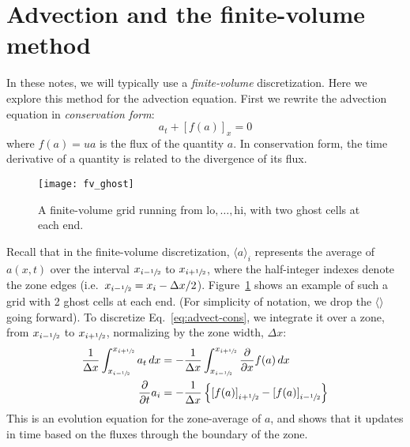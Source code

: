 
\section{Advection and the finite-volume method}

\label{ch:adv:sndorder}

In these notes, we will typically use a {\em finite-volume} discretization.  Here we
explore this method for the
advection equation.  First we rewrite the advection equation in {\em
  conservation form}:
\begin{equation}
a_t + \left[f(a)\right]_x = 0
\label{eq:advect-cons}
\end{equation}
where $f(a) = ua$ is the flux of the quantity $a$.  In conservation form,
the time derivative of a quantity is related to the divergence of
its flux.

\begin{figure}[t]
\centering
\texttt{[image: fv\_ghost]}
\caption[A finite-volume grid with valid cells
  labeled]{\label{fig:fvghost} A finite-volume grid running from
  $\mathrm{lo}, \ldots, \mathrm{hi}$, with two ghost cells at each
  end.}
\end{figure}

Recall that in the finite-volume discretization, $\langle a\rangle_i$
represents the average of $a(x,t)$ over the interval $x_{i-{\sfrac{1}{2}}}$ to
$x_{i+{\sfrac{1}{2}}}$, where the half-integer indexes denote the zone edges
(i.e.\ $x_{i-{\sfrac{1}{2}}} = x_i - \Delta x/2$).  Figure~\ref{fig:fvghost}
shows an example of such a grid with 2 ghost cells at each end.  (For
simplicity of notation, we drop the $\langle \rangle$ going forward).
To discretize Eq.~\ref{eq:advect-cons}, we integrate it over a zone,
from ${x_{i-{\sfrac{1}{2}}}}$ to ${x_{i+{\sfrac{1}{2}}}}$, normalizing by the zone width,
$\Delta x$:
\begin{align}
\frac{1}{\Delta x} \int_{x_{i-{\sfrac{1}{2}}}}^{x_{i+{\sfrac{1}{2}}}} a_t \, dx &=
   - \frac{1}{\Delta x} \int_{x_{i-{\sfrac{1}{2}}}}^{x_{i+{\sfrac{1}{2}}}} \frac{\partial}{\partial x} f(a) \, dx \\
\frac{\partial}{\partial t} a_i &=
   - \frac{1}{\Delta x} \left \{ \left [f(a) \right ]_{i+{\sfrac{1}{2}}} - \left [f(a) \right ]_{i-{\sfrac{1}{2}}} \right \} \label{adv:eq:fvadv}
\end{align}
This is an evolution equation for the zone-average of $a$, and shows
that it updates in time based on the fluxes through the boundary of
the zone.

